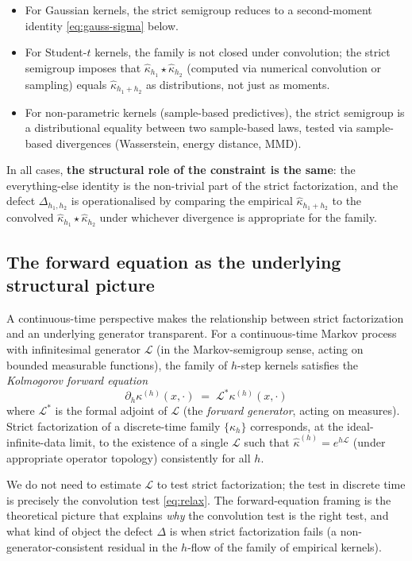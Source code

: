 \documentclass[11pt]{article}
\newcommand{\Lcal}{\mathcal{L}}
\newcommand{\defect}{\Delta}
\newcommand{\compose}{\star}
\theoremstyle{definition}
\theoremstyle{plain}
\begin{document}
\begin{itemize}[leftmargin=2em]
\item For Gaussian kernels, the strict semigroup reduces to a
second-moment identity \eqref{eq:gauss-sigma} below.
\item For Student-$t$ kernels, the family is not closed under
convolution; the strict semigroup imposes that
$\hat\kappa_{h_1} \compose \hat\kappa_{h_2}$ (computed via numerical
convolution or sampling) equals $\hat\kappa_{h_1+h_2}$ as
distributions, not just as moments.
\item For non-parametric kernels (sample-based predictives), the
strict semigroup is a distributional equality between two
sample-based laws, tested via sample-based divergences
(Wasserstein, energy distance, MMD).
\end{itemize}

In all cases, \textbf{the structural role of the constraint is the
same}: the everything-else identity is the non-trivial part of the
strict factorization, and the defect $\defect_{h_1, h_2}$ is
operationalised by comparing the empirical
$\hat\kappa_{h_1 + h_2}$ to the convolved $\hat\kappa_{h_1} \compose
\hat\kappa_{h_2}$ under whichever divergence is appropriate for the
family.

\subsection{The forward equation as the underlying structural picture}
\label{sec:forward}

A continuous-time perspective makes the relationship between strict
factorization and an underlying generator transparent. For a
continuous-time Markov process with infinitesimal generator
$\Lcal$ (in the Markov-semigroup sense, acting on bounded measurable
functions), the family of $h$-step kernels satisfies the
\emph{Kolmogorov forward equation}
\begin{equation}
  \label{eq:forward}
  \partial_h \kappa^{(h)}(x, \cdot) \;=\; \Lcal^{*} \kappa^{(h)}(x, \cdot)
\end{equation}
where $\Lcal^{*}$ is the formal adjoint of $\Lcal$ (the
\emph{forward generator}, acting on measures). Strict factorization
of a discrete-time family $\{\hat\kappa_h\}$ corresponds, at the
ideal-infinite-data limit, to the existence of a single $\Lcal$
such that $\hat\kappa^{(h)} = e^{h \Lcal}$ (under appropriate
operator topology) consistently for all $h$.

We do not need to estimate $\Lcal$ to test strict factorization;
the test in discrete time is precisely the convolution test
\eqref{eq:relax}. The forward-equation framing is the theoretical
picture that explains \emph{why} the convolution test is the right
test, and what kind of object the defect $\defect$ is when strict
factorization fails (a non-generator-consistent residual in the
$h$-flow of the family of empirical kernels).
\end{document}
